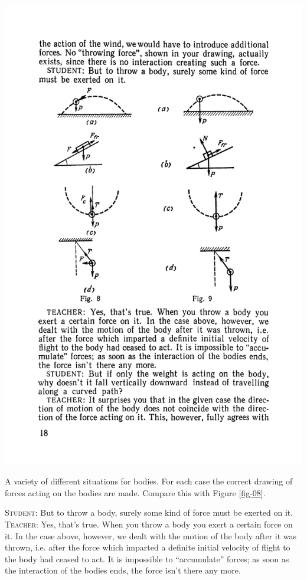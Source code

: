 \documentclass[a4paper,sfsidenotes]{tufte-book}
\begin{document}
\begin{marginfigure}[-8cm]
\centering
\includegraphics[width=\linewidth]{fig-009a.pdf}
\caption{A variety of different situations for bodies. For each case the correct drawing of forces acting on the bodies are made. Compare this with Figure \ref{fig-08}.}
\label{fig-09}
\end{marginfigure}

\textsc{Student:} But to throw a body, surely some kind of force must be exerted on it.\\

\textsc{Teacher:} Yes, that's true. When you throw a body you exert a certain force on it. In the case above, however, we dealt with the motion of the body after it was thrown, i.e. after the force which imparted a definite initial velocity of flight to the body had ceased to act. It is impossible to ``accumulate'' forces; as soon as the interaction of the bodies ends, the force isn't there any more.\\
\end{document}
